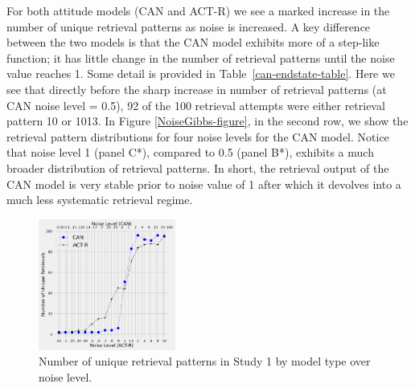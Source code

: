 \documentclass[10pt,letterpaper]{article}
\begin{document}
For both attitude models (CAN and ACT-R) we see a marked increase in the number of unique retrieval patterns as noise is increased.  A key difference between the two models is that the CAN model exhibits more of a step-like function; it has little change in the number of retrieval patterns until the noise value reaches 1.  Some detail is provided in Table~\ref{can-endstate-table}.  Here we see that directly before the sharp increase in number of retrieval patterns (at CAN noise level = 0.5), 92 of the 100 retrieval attempts were either retrieval pattern 10 or 1013.  In Figure \ref{NoiseGibbs-figure}, in the second row, we show the retrieval pattern distributions for four noise levels for the CAN model. Notice that noise level 1 (panel C*), compared to 0.5 (panel B*), exhibits a much broader distribution of retrieval patterns.  In short, the retrieval output of the CAN model is very stable prior to noise value of 1 after which it devolves into a much less systematic retrieval regime.     
\begin{figure}[H]
\begin{center}
\includegraphics[width=0.4\textwidth]{Num_Endstates_CAN-IBL.png}
\end{center}
\caption{Number of unique retrieval patterns in Study 1 by model type over noise level.} 
\label{numbendstates-figure}
\end{figure}
\end{document}
